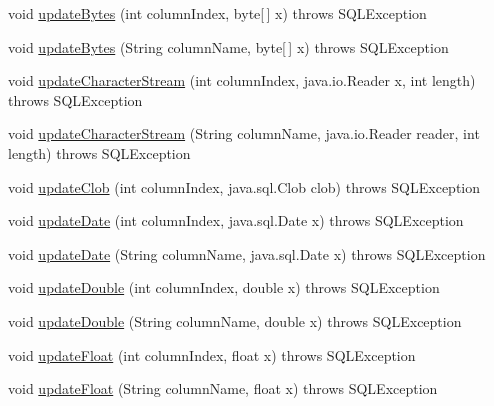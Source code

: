 \begin{DoxyCompactItemize}
\item 
void \mbox{\hyperlink{classcom_1_1mysql_1_1jdbc_1_1_updatable_result_set_a08a332f7047e0f8cec9b2b0197b38fbf}{update\+Bytes}} (int column\+Index, byte\mbox{[}$\,$\mbox{]} x)  throws S\+Q\+L\+Exception 
\item 
void \mbox{\hyperlink{classcom_1_1mysql_1_1jdbc_1_1_updatable_result_set_aad66d9ed9b558743064d1723c3c2b273}{update\+Bytes}} (String column\+Name, byte\mbox{[}$\,$\mbox{]} x)  throws S\+Q\+L\+Exception 
\item 
void \mbox{\hyperlink{classcom_1_1mysql_1_1jdbc_1_1_updatable_result_set_a0ada06905919c11d57c9838b6366a7e3}{update\+Character\+Stream}} (int column\+Index, java.\+io.\+Reader x, int length)  throws S\+Q\+L\+Exception 
\item 
void \mbox{\hyperlink{classcom_1_1mysql_1_1jdbc_1_1_updatable_result_set_aa40ad5cf67142d3dc3e3842fc16cda26}{update\+Character\+Stream}} (String column\+Name, java.\+io.\+Reader reader, int length)  throws S\+Q\+L\+Exception 
\item 
void \mbox{\hyperlink{classcom_1_1mysql_1_1jdbc_1_1_updatable_result_set_adc60deda2d478d5978e684d6efc77e4b}{update\+Clob}} (int column\+Index, java.\+sql.\+Clob clob)  throws S\+Q\+L\+Exception 
\item 
void \mbox{\hyperlink{classcom_1_1mysql_1_1jdbc_1_1_updatable_result_set_aafe2454bd0a1a422df6e0165f4828e87}{update\+Date}} (int column\+Index, java.\+sql.\+Date x)  throws S\+Q\+L\+Exception 
\item 
void \mbox{\hyperlink{classcom_1_1mysql_1_1jdbc_1_1_updatable_result_set_a1616cc440d8f6ef722aad7914a381747}{update\+Date}} (String column\+Name, java.\+sql.\+Date x)  throws S\+Q\+L\+Exception 
\item 
void \mbox{\hyperlink{classcom_1_1mysql_1_1jdbc_1_1_updatable_result_set_acaefa9679a9a4f8b588c76c960756f87}{update\+Double}} (int column\+Index, double x)  throws S\+Q\+L\+Exception 
\item 
void \mbox{\hyperlink{classcom_1_1mysql_1_1jdbc_1_1_updatable_result_set_a0f22f27383615d4803d4355a612970aa}{update\+Double}} (String column\+Name, double x)  throws S\+Q\+L\+Exception 
\item 
void \mbox{\hyperlink{classcom_1_1mysql_1_1jdbc_1_1_updatable_result_set_ac6b973ec7d85c1a9ef8d3376931a8dd2}{update\+Float}} (int column\+Index, float x)  throws S\+Q\+L\+Exception 
\item 
void \mbox{\hyperlink{classcom_1_1mysql_1_1jdbc_1_1_updatable_result_set_a530db511bea6cfb6177fad010a3aa32a}{update\+Float}} (String column\+Name, float x)  throws S\+Q\+L\+Exception 

\end{DoxyCompactItemize}
